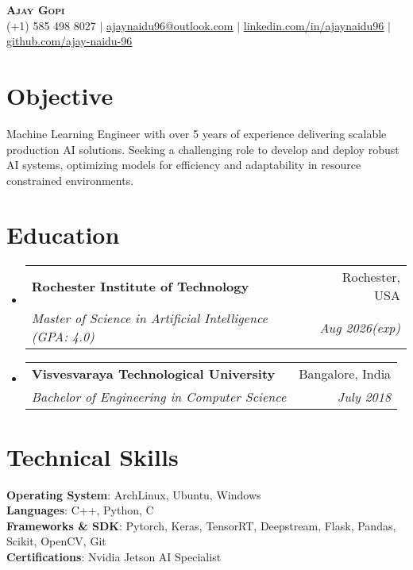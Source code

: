 \documentclass[letterpaper,10pt]{article}
\makeatletter
\newcommand{\resumeSubheading}[4]{
  \vspace{-2pt}\item
    \begin{tabular*}{0.97\textwidth}[t]{l@{\extracolsep{\fill}}r}
      \textbf{#1} & #2 \\
      \textit{\small#3} & \textit{\small #4} \\
    \end{tabular*}\vspace{-7pt}
}
\newcommand{\resumeSubHeadingListStart}{\begin{itemize}[leftmargin=0.15in, label={}]}
\newcommand{\resumeSubHeadingListEnd}{\end{itemize}}
\makeatother
\begin{document}
\begin{center}
    \textbf{\Huge \scshape Ajay Gopi} \\ \vspace{1pt}
    \small (+1) 585 498 8027 $|$ \href{mailto:ajaynaidu96@outlook.com}{\underline{ajaynaidu96@outlook.com}} $|$ 
    \href{https://www.linkedin.com/in/ajaynaidu96/}{\underline{linkedin.com/in/ajaynaidu96}} $|$
    \href{https://github.com/ajay-naidu-96/}{\underline{github.com/ajay-naidu-96}}
\end{center}


\section{Objective}
Machine Learning Engineer with over 5 years of experience delivering scalable production AI solutions. Seeking a challenging role to develop and deploy robust AI systems, optimizing models for efficiency and adaptability in resource constrained environments. 

\section{Education}
\resumeSubHeadingListStart
  \resumeSubheading
    {Rochester Institute of Technology}{Rochester, USA}
    {Master of Science in Artificial Intelligence (GPA: 4.0)}{Aug 2026(exp)}
  \resumeSubheading
    {Visvesvaraya Technological University}{Bangalore, India}
    {Bachelor of Engineering in Computer Science}{July 2018}
\resumeSubHeadingListEnd

  \section{Technical Skills}
    \begin{itemize}[leftmargin=0.15in, label={}]
      \small{\item{
      \textbf{Operating System}{: ArchLinux, Ubuntu, Windows} \\
      \textbf{Languages}{: C++, Python, C} \\
      \textbf{Frameworks \& SDK}{: Pytorch, Keras, TensorRT, Deepstream, Flask, Pandas, Scikit, OpenCV, Git} \\
      \textbf{Certifications}{: Nvidia Jetson AI Specialist}
      }}
    \end{itemize}
\end{document}
